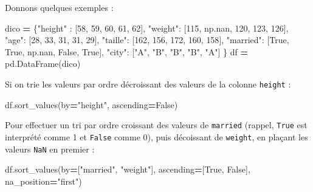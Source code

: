 \documentclass[12pt,]{book}
\newenvironment{Shaded}{\begin{snugshade}}{\end{snugshade}}
\newcommand{\DecValTok}[1]{\textcolor[rgb]{0.00,0.00,0.81}{#1}}
\newcommand{\StringTok}[1]{\textcolor[rgb]{0.31,0.60,0.02}{#1}}
\newcommand{\VariableTok}[1]{\textcolor[rgb]{0.00,0.00,0.00}{#1}}
\newcommand{\OperatorTok}[1]{\textcolor[rgb]{0.81,0.36,0.00}{\textbf{#1}}}
\newcommand{\NormalTok}[1]{#1}
\numberwithin{equation}{section}
\numberwithin{countremarque}{section}
\begin{document}
Donnons quelques exemples :

\begin{Shaded}
\begin{Highlighting}[]
\NormalTok{dico }\OperatorTok{=}\NormalTok{ \{}\StringTok{"height"}\NormalTok{ : [}\DecValTok{58}\NormalTok{, }\DecValTok{59}\NormalTok{, }\DecValTok{60}\NormalTok{, }\DecValTok{61}\NormalTok{, }\DecValTok{62}\NormalTok{],}
        \StringTok{"weight"}\NormalTok{: [}\DecValTok{115}\NormalTok{, np.nan, }\DecValTok{120}\NormalTok{, }\DecValTok{123}\NormalTok{, }\DecValTok{126}\NormalTok{],}
        \StringTok{"age"}\NormalTok{: [}\DecValTok{28}\NormalTok{, }\DecValTok{33}\NormalTok{, }\DecValTok{31}\NormalTok{, }\DecValTok{31}\NormalTok{, }\DecValTok{29}\NormalTok{],}
        \StringTok{"taille"}\NormalTok{: [}\DecValTok{162}\NormalTok{, }\DecValTok{156}\NormalTok{, }\DecValTok{172}\NormalTok{, }\DecValTok{160}\NormalTok{, }\DecValTok{158}\NormalTok{],}
        \StringTok{"married"}\NormalTok{: [}\VariableTok{True}\NormalTok{, }\VariableTok{True}\NormalTok{, np.nan, }\VariableTok{False}\NormalTok{, }\VariableTok{True}\NormalTok{],}
        \StringTok{"city"}\NormalTok{: [}\StringTok{"A"}\NormalTok{, }\StringTok{"B"}\NormalTok{, }\StringTok{"B"}\NormalTok{, }\StringTok{"B"}\NormalTok{, }\StringTok{"A"}\NormalTok{]}
\NormalTok{       \} }
\NormalTok{df }\OperatorTok{=}\NormalTok{ pd.DataFrame(dico)}
\end{Highlighting}
\end{Shaded}

Si on trie les valeurs par ordre décroissant des valeurs de la colonne
\texttt{height} :

\begin{Shaded}
\begin{Highlighting}[]
\NormalTok{df.sort_values(by}\OperatorTok{=}\StringTok{"height"}\NormalTok{, ascending}\OperatorTok{=}\VariableTok{False}\NormalTok{)}
\end{Highlighting}
\end{Shaded}

Pour effectuer un tri par ordre croissant des valeurs de
\texttt{married} (rappel, \texttt{True} est interprété comme 1 et
\texttt{False} comme 0), puis décoissant de \texttt{weight}, en plaçant
les valeurs \texttt{NaN} en premier :

\begin{Shaded}
\begin{Highlighting}[]
\NormalTok{df.sort_values(by}\OperatorTok{=}\NormalTok{[}\StringTok{"married"}\NormalTok{, }\StringTok{"weight"}\NormalTok{],}
\NormalTok{               ascending}\OperatorTok{=}\NormalTok{[}\VariableTok{True}\NormalTok{, }\VariableTok{False}\NormalTok{],}
\NormalTok{               na_position}\OperatorTok{=}\StringTok{"first"}\NormalTok{)}
\end{Highlighting}
\end{Shaded}
\end{document}

